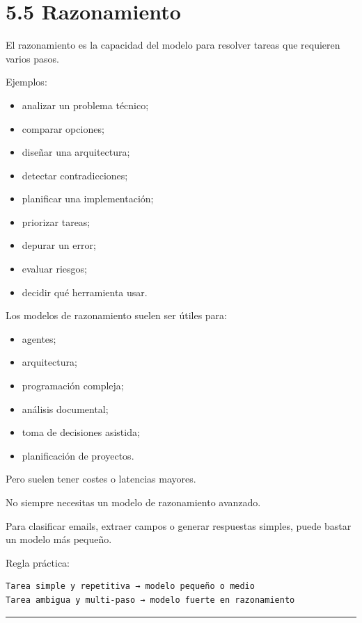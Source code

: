 \section{5.5 Razonamiento}\label{razonamiento}

El razonamiento es la capacidad del modelo para resolver tareas que
requieren varios pasos.

Ejemplos:

\begin{itemize}
\tightlist
\item
  analizar un problema técnico;
\item
  comparar opciones;
\item
  diseñar una arquitectura;
\item
  detectar contradicciones;
\item
  planificar una implementación;
\item
  priorizar tareas;
\item
  depurar un error;
\item
  evaluar riesgos;
\item
  decidir qué herramienta usar.
\end{itemize}

Los modelos de razonamiento suelen ser útiles para:

\begin{itemize}
\tightlist
\item
  agentes;
\item
  arquitectura;
\item
  programación compleja;
\item
  análisis documental;
\item
  toma de decisiones asistida;
\item
  planificación de proyectos.
\end{itemize}

Pero suelen tener costes o latencias mayores.

No siempre necesitas un modelo de razonamiento avanzado.

Para clasificar emails, extraer campos o generar respuestas simples,
puede bastar un modelo más pequeño.

Regla práctica:

\begin{lstlisting}
Tarea simple y repetitiva → modelo pequeño o medio
Tarea ambigua y multi-paso → modelo fuerte en razonamiento
\end{lstlisting}

\begin{center}\rule{0.5\linewidth}{0.5pt}\end{center}

